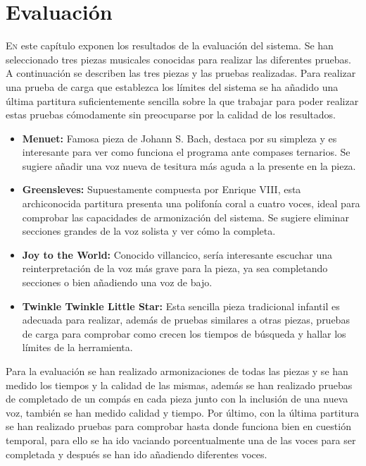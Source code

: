 \chapter{Evaluación}
\label{chap:evaluation}
\vspace{0.5cm}


 \lettrine{E}{n} este capítulo exponen los resultados de la evaluación del sistema. Se han seleccionado tres piezas musicales conocidas para realizar las diferentes pruebas. A continuación se describen las tres piezas y las pruebas realizadas. Para realizar una prueba de carga que establezca los límites del sistema se ha añadido una última partitura suficientemente sencilla sobre la que trabajar para poder realizar estas pruebas cómodamente sin preocuparse por la calidad de los resultados.
 
 \begin{itemize}
 	\item \textbf{Menuet:} Famosa pieza de Johann S. Bach, destaca por su simpleza y es interesante para ver como funciona el programa ante compases ternarios. Se sugiere añadir una voz nueva de tesitura más aguda a la presente en la pieza.
 	\item \textbf{Greensleves:} Supuestamente compuesta por Enrique VIII, esta archiconocida partitura presenta una polifonía coral a cuatro voces, ideal para comprobar las capacidades de armonización del sistema. Se sugiere eliminar secciones grandes de la voz solista y ver cómo la completa.
 	\item \textbf{Joy to the World:} Conocido villancico, sería interesante escuchar una reinterpretación de la voz más grave para la pieza, ya sea completando secciones o bien añadiendo una voz de bajo.
    \item \textbf{Twinkle Twinkle Little Star:} Esta sencilla pieza tradicional infantil es adecuada para realizar, además de pruebas similares a otras piezas, pruebas de carga para comprobar como crecen los tiempos de búsqueda y hallar los límites de la herramienta.
 \end{itemize}
 
 Para la evaluación se han realizado armonizaciones de todas las piezas y se han medido los tiempos y la calidad de las mismas, además se han realizado pruebas de completado de un compás en cada pieza junto con la inclusión de una nueva voz, también se han medido calidad y tiempo. Por último, con la última partitura se han realizado pruebas para comprobar hasta donde funciona bien en cuestión temporal, para ello se ha ido vaciando porcentualmente una de las voces para ser completada y después se han ido añadiendo diferentes voces.
 
